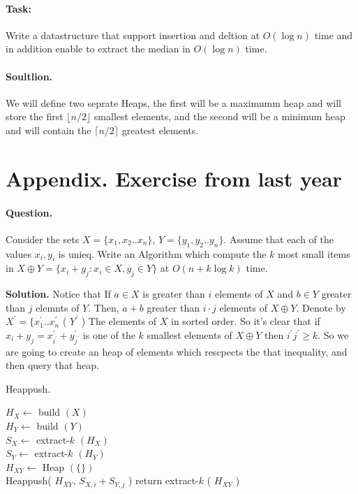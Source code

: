 \paragraph{Task:}Write a datastructure that support insertion and deltion at $O\left( \log n \right) $ time and in addition enable to extract the median in $O\left( \log n  \right)$ time. 

\paragraph{Soultlion.} We will define two seprate  Heaps, the first will be a maximumm heap and will store the first $ \lfloor n/2 \rfloor $ smallest elements, and the second will be a minimum heap and will contain the $ \lceil n/2 \rceil$ greatest elements. 

  \newpage
\section{ Appendix. Exercise from last year }

\paragraph{Question.} Consider the sets $X = \{x_1,x_2 .. x_n\}$, $Y = \{y_1, y_2 .. y_n\}$. Assume that each of the values $x_i,y_i$ is unieq. Write an Algorithm which compute the $k$ most small items in $X \oplus Y = \{ x_{i} + y_{j} : x_{i} \in X , y_{j} \in Y  \} $ at $ O \left( n + k\log k  \right) $ time. 

\textbf{Solution.} Notice that If $a \in X$ is greater than $i$ elements of $X$ and $b \in Y$ greater than $j$ elemnts of $Y$. Then, $a + b$  greater than $i\cdot j$ elements of $X \oplus Y$. Denote by $X^\prime = \{ x^{\prime}_{1} .. x^{\prime}_{n}$ ( $Y^{\prime}$ ) The elements of $X$ in sorted order. So it's clear that if $x_{i}+y_{j} = x^{\prime}_{i^{\prime}} + y^{\prime}_{j^{\prime}}$ is one of the $k$ smallest elements of $X\oplus Y$ then $i^{\prime}j^{\prime} \ge k$. So we are going to create an heap of elements which rescpects the that inequality, and then query that heap.

\begin{algbox}{Heappush.}
\begin{algorithm}[H]
{}
$ H_{X} \leftarrow $ build $\left( X \right)$  \\ 
$ H_{Y} \leftarrow $ build $\left( Y \right)$  \\
$ S_{X} \leftarrow $ extract-$k$ $\left( H_{X} \right)$  \\ 
$ S_{Y} \leftarrow $ extract-$k$ $\left( H_{Y} \right)$  \\
$ H_{XY} \leftarrow $ Heap $(\{ \} )$ \\
 {
   {
  	Heappush( $H_{XY}$, $S_{X,i} + S_{Y, j}$ )    
  }
}
return extract-$k$ ( $H_{XY}$ ) 
\end{algorithm}
\end{algbox}




